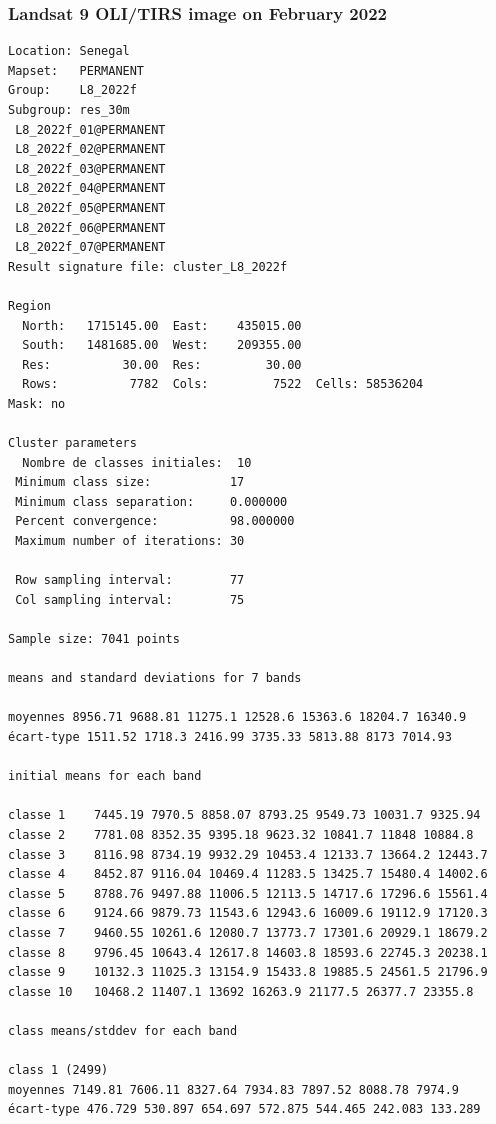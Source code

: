 \documentclass[land,article,submit,pdftex,moreauthors]{Definitions/mdpi}
\begin{document}
\subsubsection[\appendixname~\thesubsubsection]{Landsat 9 OLI/TIRS image on February 2022}
\begin{scriptsize}
\begin{verbatim}
Location: Senegal
Mapset:   PERMANENT
Group:    L8_2022f
Subgroup: res_30m
 L8_2022f_01@PERMANENT
 L8_2022f_02@PERMANENT
 L8_2022f_03@PERMANENT
 L8_2022f_04@PERMANENT
 L8_2022f_05@PERMANENT
 L8_2022f_06@PERMANENT
 L8_2022f_07@PERMANENT
Result signature file: cluster_L8_2022f

Region
  North:   1715145.00  East:    435015.00
  South:   1481685.00  West:    209355.00
  Res:          30.00  Res:         30.00
  Rows:          7782  Cols:         7522  Cells: 58536204
Mask: no

Cluster parameters
  Nombre de classes initiales: 	10
 Minimum class size:           17
 Minimum class separation:     0.000000
 Percent convergence:          98.000000
 Maximum number of iterations: 30

 Row sampling interval:        77
 Col sampling interval:        75

Sample size: 7041 points

means and standard deviations for 7 bands

moyennes 8956.71 9688.81 11275.1 12528.6 15363.6 18204.7 16340.9
écart-type 1511.52 1718.3 2416.99 3735.33 5813.88 8173 7014.93

initial means for each band

classe 1    7445.19 7970.5 8858.07 8793.25 9549.73 10031.7 9325.94
classe 2    7781.08 8352.35 9395.18 9623.32 10841.7 11848 10884.8
classe 3    8116.98 8734.19 9932.29 10453.4 12133.7 13664.2 12443.7
classe 4    8452.87 9116.04 10469.4 11283.5 13425.7 15480.4 14002.6
classe 5    8788.76 9497.88 11006.5 12113.5 14717.6 17296.6 15561.4
classe 6    9124.66 9879.73 11543.6 12943.6 16009.6 19112.9 17120.3
classe 7    9460.55 10261.6 12080.7 13773.7 17301.6 20929.1 18679.2
classe 8    9796.45 10643.4 12617.8 14603.8 18593.6 22745.3 20238.1
classe 9    10132.3 11025.3 13154.9 15433.8 19885.5 24561.5 21796.9
classe 10   10468.2 11407.1 13692 16263.9 21177.5 26377.7 23355.8

class means/stddev for each band

class 1 (2499)
moyennes 7149.81 7606.11 8327.64 7934.83 7897.52 8088.78 7974.9
écart-type 476.729 530.897 654.697 572.875 544.465 242.083 133.289


\end{verbatim}
\end{scriptsize}
\end{document}
